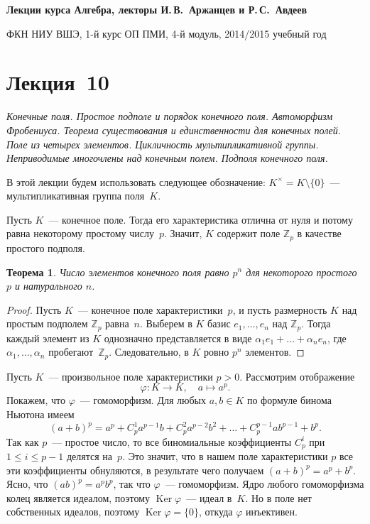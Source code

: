 \documentclass[a4paper,10pt]{amsart}
\newcommand{\Ker}{\mathop{\mathrm{Ker}}}
\def\ZZ{{\mathbb Z}}%
\newtheorem{theorem}{Теорема}
\theoremstyle{definition}
\theoremstyle{remark}
\begin{document}
%
\sloppy
%
\centerline{\large \bf Лекции курса \guillemotleft
Алгебра\guillemotright{}, лекторы И.\,В.~Аржанцев и Р.\,С.~Авдеев}

\smallskip

\centerline{\large ФКН НИУ ВШЭ, 1-й курс ОП ПМИ, 4-й модуль,
2014/2015 учебный год}


\bigskip

\section*{Лекция~10}

\medskip

{\it Конечные поля. Простое подполе и порядок конечного поля.
Автоморфизм Фробениуса. Теорема существования и единственности для
конечных полей. Поле из четырех элементов. Цикличность
мультипликативной группы. Неприводимые многочлены над конечным
полем. Подполя конечного поля.}

\medskip

В этой лекции будем использовать следующее обозначение: $K^\times =
K \setminus \lbrace 0 \rbrace$~--- мультипликативная группа
поля~$K$.

Пусть $K$~--- конечное поле. Тогда его характеристика отлична от
нуля и потому равна некоторому простому числу~$p$. Значит, $K$
содержит поле $\ZZ_p$ в качестве простого подполя.

\begin{theorem} \label{thm1}
Число элементов конечного поля равно $p^n$ для некоторого простого
$p$ и натурального $n$.
\end{theorem}

\begin{proof}
Пусть $K$~--- конечное поле характеристики~$p$, и пусть размерность
$K$ над простым подполем $\ZZ_p$ равна~$n$. Выберем в $K$ базис
$e_1, \ldots, e_n$ над $\ZZ_p$. Тогда каждый элемент из $K$
однозначно представляется в виде $\alpha_1 e_1 + \ldots + \alpha_n
e_n$, где $\alpha_1, \ldots, \alpha_n$ пробегают~$\ZZ_p$.
Следовательно, в $K$ ровно $p^n$ элементов.
\end{proof}

Пусть $K$~--- произвольное поле характеристики $p > 0$. Рассмотрим
отображение
$$
\varphi \colon K \to K, \quad a \mapsto a^p.
$$
Покажем, что $\varphi$~--- гомоморфизм. Для любых $a,b \in K$ по
формуле бинома Ньютона имеем
$$
(a + b)^p = a^p + C_p^1 a^{p-1}b + C_p^2 a^{p-2}b^2 + \ldots +
C_p^{p-1} a b^{p-1} + b^p.
$$
Так как $p$~--- простое число, то все биномиальные коэффициенты
$C_p^i$ при $1 \leqslant i \leqslant p-1$ делятся на~$p$. Это
значит, что в нашем поле характеристики $p$ все эти коэффициенты
обнуляются, в результате чего получаем $(a + b)^p = a^p + b^p$.
Ясно, что $(ab)^p = a^p b^p$, так что $\varphi$~--- гомоморфизм.
Ядро любого гомоморфизма колец является идеалом, поэтому $\Ker
\varphi$~--- идеал в~$K$. Но в поле нет собственных идеалов, поэтому
$\Ker \varphi = \lbrace 0 \rbrace$, откуда $\varphi$ инъективен.
\end{document}
